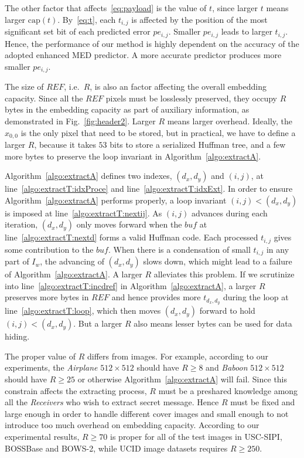 \documentclass[journal]{IEEEtran}
\begin{document}
	The other factor that affects~\eqref{eq:payload} is the value of \(t\), since larger \(t\) means larger \(\mathrm{cap}(t)\).
	By~\eqref{eq:t}, each \(t_{i, j}\) is affected by the position of the most significant set bit of each predicted error \(pe_{i, j}\).
	Smaller \(pe_{i, j}\) leads to larger \(t_{i, j}\).
	Hence, the performance of our method is highly dependent on the accuracy of the adopted enhanced MED predictor.
	A more accurate predictor produces more smaller \(pe_{i, j}\).
	
	The size of \(REF\), i.e.~\(R\), is also an factor affecting the overall embedding capacity.
	Since all the \(REF\) pixels must be losslessly preserved, they occupy \(R\) bytes in the embedding capacity as part of auxiliary information, as demonstrated in Fig.~\ref{fig:header2}.
	Larger \(R\) means larger overhead.
	Ideally, the \(x_{0, 0}\) is the only pixel that need to be stored, but in practical, we have to define a larger \(R\), 
	because it takes \(53\) bits to store a serialized Huffman tree, and a few more bytes to preserve the loop invariant in Algorithm~\ref{algo:extractA}.
	
	Algorithm~\ref{algo:extractA} defines two indexes, \((d_x, d_y)\) and \((i, j)\), at line~\ref{algo:extractT:idxProce} and line~\ref{algo:extractT:idxExt}. 
	In order to ensure Algorithm~\ref{algo:extractA} performs properly, a loop invariant \((i, j) < (d_x, d_y)\) is imposed at line~\ref{algo:extractT:nextij}.
	As \((i, j)\) advances during each iteration, \((d_x, d_y)\) only moves forward when the \(buf\) at line~\ref{algo:extractT:nextd} forms a valid Huffman code. 
	Each processed \(t_{i, j}\) gives some contribution to the \(buf\).
	When there is a condensation of small \(t_{i, j}\) in any part of \(I_w\), the advancing of \((d_x, d_y)\) slows down, which might lead to a failure of Algorithm~\ref{algo:extractA}.
	A larger \(R\) alleviates this problem.
	If we scrutinize into line~\ref{algo:extractT:incdref} in Algorithm~\ref{algo:extractA}, a larger \(R\) preserves more bytes in \(REF\)  and hence provides more \(t_{d_x, d_y}\) during the loop at line~\ref{algo:extractT:loop}, which then moves \((d_x, d_y)\) forward to hold \((i, j) < (d_x, d_y)\).
	But a larger \(R\) also means lesser bytes can be used for data hiding.
	
	The proper value of \(R\) differs from images. For example, according to our experiments, the \emph{Airplane} \(512 \times 512\) should have \(R \geq 8\) and \emph{Baboon} \(512 \times 512\) should have \(R \geq 25\) or otherwise Algorithm~\ref{algo:extractA} will fail.
	Since this constrain affects the extracting process, \(R\) must be a preshared knowledge among all the \emph{Receivers} who wish to extract secret message. 
	Hence \(R\) must be fixed and large enough in order to handle different cover images and small enough to not introduce too much overhead on embedding capacity.
	According to our experimental results, \(R \geq 70\) is proper for all of the test images in USC-SIPI, 
	BOSSBase and BOWS-2, 
	while UCID image datasets requires \(R \geq 250\).
	
\end{document}
